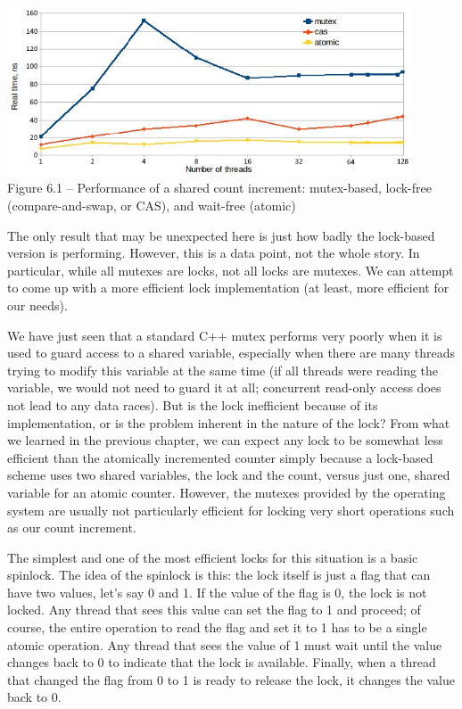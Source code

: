 \hspace*{\fill} \\ %
\begin{center}
\includegraphics[width=0.9\textwidth]{content/2/chapter6/images/1.jpg}\\
Figure 6.1 – Performance of a shared count increment: mutex-based, lock-free (compare-and-swap, or CAS), and wait-free (atomic)
\end{center}

The only result that may be unexpected here is just how badly the lock-based version is performing. However, this is a data point, not the whole story. In particular, while all mutexes are locks, not all locks are mutexes. We can attempt to come up with a more efficient lock implementation (at least, more efficient for our needs).


We have just seen that a standard C++ mutex performs very poorly when it is used to guard access to a shared variable, especially when there are many threads trying to modify this variable at the same time (if all threads were reading the variable, we would not need to guard it at all; concurrent read-only access does not lead to any data races). But is the lock inefficient because of its implementation, or is the problem inherent in the nature of the lock? From what we learned in the previous chapter, we can expect any lock to be somewhat less efficient than the atomically incremented counter simply because a lock-based scheme uses two shared variables, the lock and the count, versus just one, shared variable for an atomic counter. However, the mutexes provided by the operating system are usually not particularly efficient for locking very short operations such as our count increment.

The simplest and one of the most efficient locks for this situation is a basic spinlock. The idea of the spinlock is this: the lock itself is just a flag that can have two values, let's say 0 and 1. If the value of the flag is 0, the lock is not locked. Any thread that sees this value can set the flag to 1 and proceed; of course, the entire operation to read the flag and set it to 1 has to be a single atomic operation. Any thread that sees the value of 1 must wait until the value changes back to 0 to indicate that the lock is available. Finally, when a thread that changed the flag from 0 to 1 is ready to release the lock, it changes the value back to 0.

